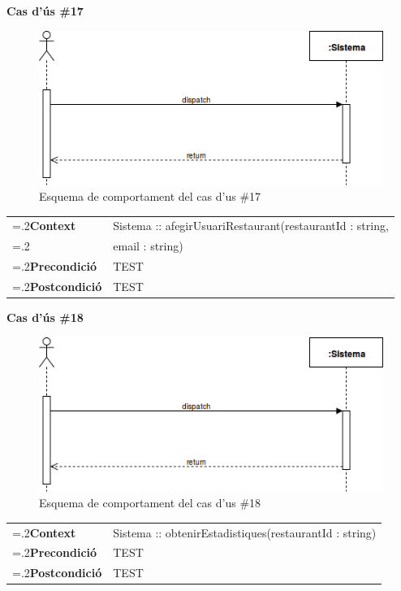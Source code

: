 \clearpage
\noindent\textbf{\large Cas d'ús \#17}\\
\begin{figure}[H]
\centering
\includegraphics[scale=0.6]{Figures/casdus_00.png}
\caption{Esquema de comportament del cas d'us \#17}
\end{figure}
\begin{table}[h]
\noindent
\begin{tabularx}{\linewidth}{
>{\hsize=.2\hsize}X%
>{\hsize=0.8\hsize}X%
}
\textbf{Context} 		& Sistema :: afegirUsuariRestaurant(restaurantId : string,\\
						& email : string) \\
\textbf{Precondició} 	& TEST \\
\textbf{Postcondició}	& TEST \\
\end{tabularx}
\label{}
\end{table}

\noindent\textbf{\large Cas d'ús \#18}\\
\begin{figure}[H]
\centering
\includegraphics[scale=0.6]{Figures/casdus_00.png}
\caption{Esquema de comportament del cas d'us \#18}
\end{figure}
\begin{table}[h]
\noindent
\begin{tabularx}{\linewidth}{
>{\hsize=.2\hsize}X%
>{\hsize=0.8\hsize}X%
}
\textbf{Context} 		& Sistema :: obtenirEstadistiques(restaurantId : string) \\
\textbf{Precondició} 	& TEST \\
\textbf{Postcondició}	& TEST \\
\end{tabularx}
\label{}
\end{table}

